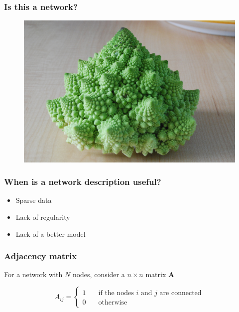 \documentclass{beamer}
\begin{document}
\begin{frame}
    \frametitle{Is this a network?}
\begin{figure}
    \begin{center}
        \includegraphics[width=0.7\columnwidth]{cauliflower.jpeg}
    \end{center}
\end{figure}
\end{frame}
\begin{frame}
    \frametitle{When is a network description useful?}
    \begin{itemize}
    \setlength\itemsep{1em}
        \item{Sparse data}
        \item{Lack of regularity}
        \item{Lack of a better model}
    \end{itemize}
\end{frame}
\begin{frame}
    \frametitle{Adjacency matrix}
    \centering
    For a network with $N$ nodes, consider a $n\times n$ matrix ${\mathbf A}$

$$A_{ij} = \begin{cases}1 &\quad \text{if the nodes $i$ and $j$ are connected}\\0 &\quad \text{otherwise}\end{cases}$$

\end{frame}
\end{document}
